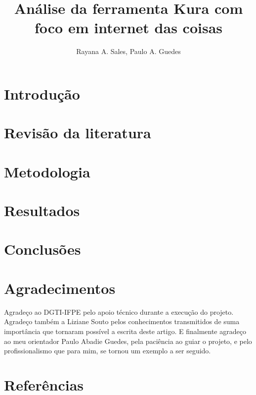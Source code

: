 \documentclass[12pt]{article}
\title{Análise da ferramenta Kura com foco em internet das coisas}
\author{Rayana A. Sales\inst{1}, Paulo A. Guedes\inst{2} }
\begin{document}
\maketitle

\begin{abstract}

\end{abstract}

\resumo


\section{Introdução}


\section{Revisão da literatura}


\section{Metodologia}


\section{Resultados}


\section{Conclusões}


\section{Agradecimentos}
Agradeço ao DGTI-IFPE pelo apoio técnico durante a execução do projeto. Agradeço também a Liziane Souto pelos conhecimentos transmitidos de suma importância que tornaram possível a escrita deste artigo. E finalmente agradeço ao meu orientador Paulo Abadie Guedes, pela paciência ao guiar o projeto, e pelo profissionalismo que para mim, se tornou um exemplo a ser seguido.

\section{Referências}



\end{document}
